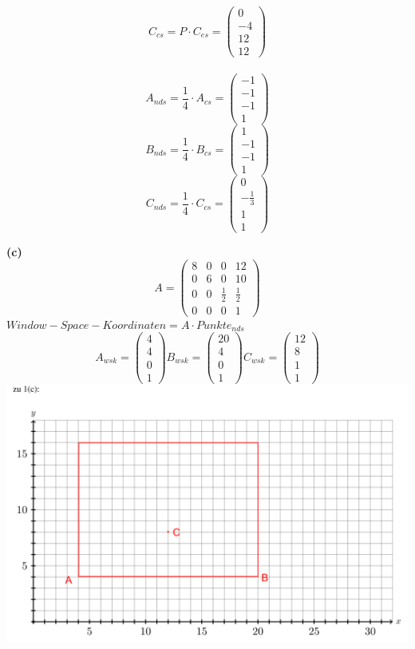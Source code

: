 \documentclass[fleqn]{article}
\begin{document}
$$C_{cs} = P \cdot C_{es} = \begin{pmatrix} 0 \\ -4 \\ 12 \\ 12 \end{pmatrix}$$
\\
$$A_{nds} = \frac{1}{4} \cdot A_{cs} = \begin{pmatrix} -1 \\ -1 \\ -1 \\ 1 \end{pmatrix}$$
$$B_{nds} = \frac{1}{4} \cdot B_{cs} = \begin{pmatrix} 1 \\ -1 \\ -1 \\ 1 \end{pmatrix}$$
$$C_{nds} = \frac{1}{4} \cdot C_{cs} = \begin{pmatrix} 0 \\ -\frac{1}{3} \\ 1 \\ 1 \end{pmatrix}$$

\indent\textbf{(c)}
$$A = 
\begin{pmatrix}
    8 & 0 & 0 & 12 \\
    0 & 6 & 0 & 10 \\
    0 & 0 & \frac{1}{2} & \frac{1}{2} \\
    0 & 0 & 0 & 1
\end{pmatrix}
$$
$Window-Space-Koordinaten = A \cdot Punkte_{nds}$
$$A_{wsk} = \begin{pmatrix} 4 \\ 4 \\ 0 \\ 1 \end{pmatrix}
B_{wsk} = \begin{pmatrix} 20 \\ 4 \\ 0 \\ 1 \end{pmatrix}
C_{wsk} = \begin{pmatrix} 12 \\ 8 \\ 1 \\ 1 \end{pmatrix}$$
\includegraphics[scale=0.3]{QQ截图20200114020456.png}
\end{document}
